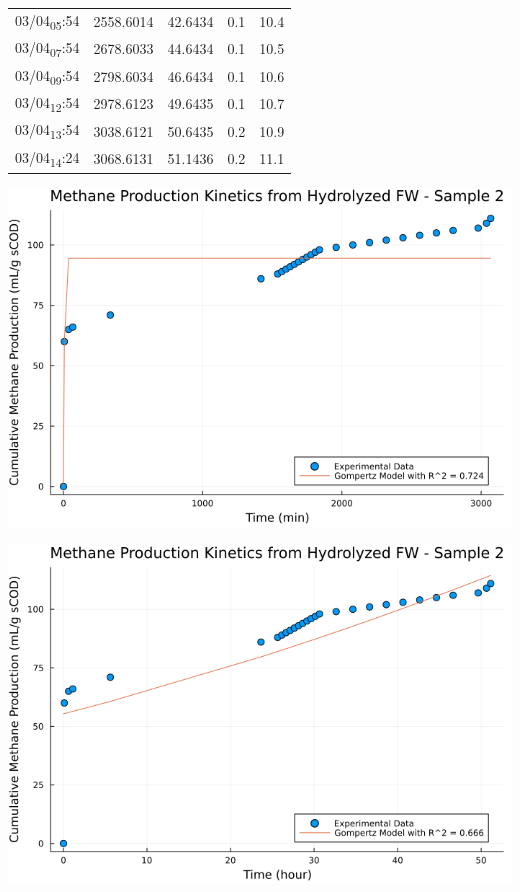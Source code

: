 \documentclass[11pt]{article}
\begin{document}
\begin{center}
\begin{tabular}{lrrrr}
03/04\textsubscript{05}:54 & 2558.6014 & 42.6434 & 0.1 & 10.4\\[0pt]
03/04\textsubscript{07}:54 & 2678.6033 & 44.6434 & 0.1 & 10.5\\[0pt]
03/04\textsubscript{09}:54 & 2798.6034 & 46.6434 & 0.1 & 10.6\\[0pt]
03/04\textsubscript{12}:54 & 2978.6123 & 49.6435 & 0.1 & 10.7\\[0pt]
03/04\textsubscript{13}:54 & 3038.6121 & 50.6435 & 0.2 & 10.9\\[0pt]
03/04\textsubscript{14}:24 & 3068.6131 & 51.1436 & 0.2 & 11.1\\[0pt]
\end{tabular}
\end{center}

\begin{center}
\includegraphics[width=.9\linewidth]{../plots/BMPs/Hydrolyzed FW/methane_kinetics_hydrolysate_2_min.png}
\end{center}

\begin{center}
\includegraphics[width=.9\linewidth]{../plots/BMPs/Hydrolyzed FW/methane_kinetics_hydrolysate_2_hour.png}
\end{center}
\end{document}
